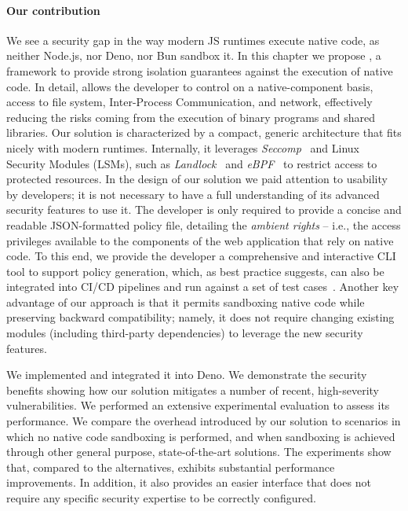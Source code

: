 \paragraph*{Our contribution}

We see a security gap in the way modern JS runtimes execute native
code, as neither Node.js, nor Deno, nor Bun sandbox it.  In this chapter
we propose \natisand, a framework to provide strong isolation guarantees
against the execution of native code. In detail, \natisand allows the
developer to control on a native-component basis, access to file system, Inter-Process
Communication, and network, effectively reducing the risks coming from
the execution of binary programs and shared libraries. Our solution is
characterized by a compact, generic architecture that fits nicely with
modern runtimes. Internally, it leverages {\em
  Seccomp}~\cite{seccompbpf} and Linux Security Modules (LSMs), such
as {\em Landlock}~\cite{landlock} and {\em eBPF}~\cite{corbet2014eBPF}
to restrict access to protected resources. In the design of our
solution we paid attention to usability by developers; it is not
necessary to have a full understanding of its advanced security
features to use it.  The developer is only required to provide a
concise and readable JSON-formatted policy file, detailing the {\em
  ambient rights} -- i.e., the access privileges available to the
components of the web application that rely on native code. To this
end, we provide the developer a comprehensive and interactive CLI tool
to support policy generation, which, as best practice
suggests, can also be integrated into CI/CD pipelines and run against
a set of test cases~\cite{sandtrap,slimtoolkit}. Another key advantage
of our approach is that it permits sandboxing native code while
preserving backward compatibility; namely, it does not require
changing existing modules (including third-party dependencies) to
leverage the new security features.

We implemented \natisand and integrated it into Deno. We demonstrate the
security benefits showing how our solution mitigates a number of
recent, high-severity vulnerabilities. We performed an extensive
experimental evaluation to assess its performance. We compare the
overhead introduced by our solution to scenarios in which no native
code sandboxing is performed, and when sandboxing is achieved through
other general purpose, state-of-the-art solutions. The experiments
show that, compared to the alternatives, \natisand exhibits substantial
performance improvements. In addition, it also provides an easier
interface that does not require any specific security expertise to be
correctly configured.


